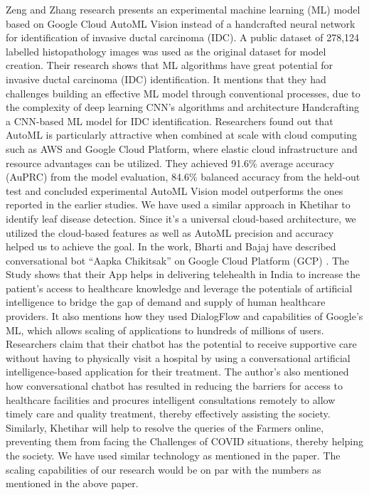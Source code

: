 \documentclass[10pt,conference]{IEEEtran}
\begin{document}
{Zeng and Zhang \cite{shen2020helping} \cite{zeng2020machine} research presents an experimental machine learning (ML) model based on Google Cloud AutoML Vision instead of a handcrafted neural network for identification of invasive ductal carcinoma (IDC).  A public dataset of 278,124 labelled histopathology images was used as the original dataset for model creation. Their research shows that ML algorithms have great potential for invasive ductal carcinoma (IDC) identification. It mentions that they  had challenges building an effective ML model through conventional processes, due to the complexity of deep learning CNN's algorithms and architecture Handcrafting a CNN-based ML model for IDC identification. Researchers found out that AutoML is particularly attractive when combined at scale with cloud computing such as AWS and Google Cloud Platform, where elastic cloud infrastructure and resource advantages can be utilized. They achieved 91.6\% average accuracy (AuPRC) from the model evaluation, 84.6\% balanced accuracy from the held-out test and concluded experimental AutoML Vision model outperforms the ones reported in the earlier studies. We have used a similar approach in Khetihar to identify leaf disease detection. Since it's a universal cloud-based architecture, we utilized the cloud-based features as well as AutoML precision and accuracy helped us to achieve the goal.
\newline
\newline
In the work, Bharti and Bajaj have described conversational bot “Aapka Chikitsak” on Google Cloud Platform (GCP) \cite{deng2009imagenet}. The Study shows that their App helps in delivering telehealth in India to increase the patient's access to healthcare knowledge and leverage the potentials of artificial intelligence to bridge the gap of demand and supply of human healthcare providers. It \cite{sabharwal2020introduction} also mentions how they used DialogFlow and capabilities of Google's ML, which allows scaling of applications to hundreds of millions of users. Researchers claim that their chatbot has the potential to receive supportive care without having to physically visit a hospital by using a conversational artificial intelligence-based application for their treatment. The author’s also mentioned how conversational chatbot has resulted in reducing the barriers for access to healthcare facilities and procures intelligent consultations remotely to allow timely care and quality treatment, thereby effectively assisting the society. Similarly, Khetihar will help to resolve the queries of the Farmers online, preventing them from facing the Challenges of COVID situations, thereby helping the society. We have used similar technology as mentioned in the paper. The scaling capabilities of our research would be on par with the numbers as mentioned in the above paper.
}
\end{document}
